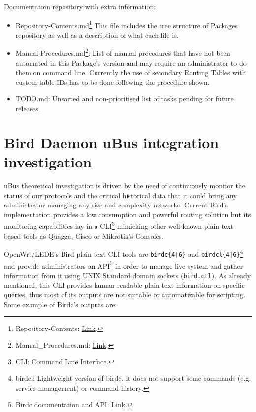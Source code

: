 Documentation repository with extra information:
\begin{itemize}
    \item Repository-Contents.md\footnote{Repository-Contents: \href{https://github.com/eloicaso/bgp-bmx6-bird-docn/blob/master/EN/Repository-Contents.md}{Link}.} This file includes the tree structure of Packages repository as well as a description of what each file is.
    \item Manual-Procedures.md\footnote{Manual\_Procedures.md: \href{https://github.com/eloicaso/bgp-bmx6-bird-docn/blob/master/EN/manual_procedures.md}{Link}.}: List of manual procedures that have not been automated in this Package's version and may require an administrator to do them on command line.
    Currently the use of secondary Routing Tables with custom table IDs has to be done following the procedure shown.
    \item TODO.md: Unsorted and non-prioritised list of tasks pending for future releases.
\end{itemize}

\section{Bird Daemon uBus integration investigation}
uBus theoretical investigation is driven by the need of continuously monitor the status of our protocols and the critical historical data that it could bring any administrator managing any size and complexity networks. Current Bird's implementation provides a low consumption and powerful routing solution but its monitoring capabilities lay in a CLI\footnote{CLI: Command Line Interface.} mimicking other well-known plain text-based tools as Quagga, Cisco or Mikrotik's Consoles.

OpenWrt/LEDE's Bird plain-text CLI tools are \texttt{birdc\{4|6\}} and \texttt{birdcl\{4|6\}}\footnote{birdcl: Lightweight version of birdc. It does not support some commands (e.g. service management) or command history.} and provide administrators an API\footnote{Birdc documentation and API: \href{http://bird.network.cz/?get_doc&f=bird-4.html}{Link}.} in order to manage live system and gather information from it using UNIX Standard domain sockets (\texttt{bird.ctl}). As already mentioned, this CLI provides human readable plain-text information on specific queries, thus most of its outputs are not suitable or automatizable for scripting. Some example of Birdc's outputs are:



